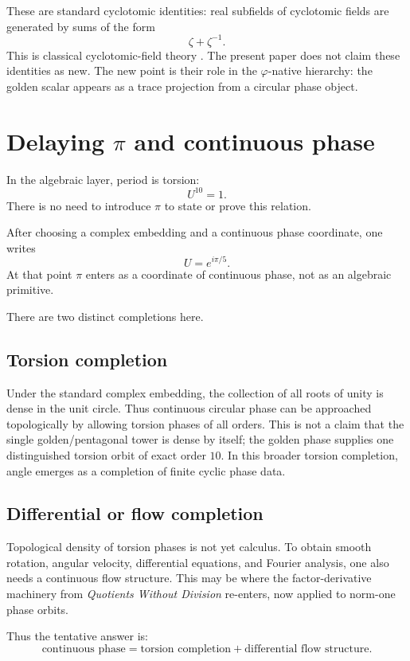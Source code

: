 \documentclass[11pt]{article}
\newcommand{\ph}{\varphi}
\begin{document}
These are standard cyclotomic identities: real subfields of cyclotomic fields are generated by sums of the form
\[
    \zeta+\zeta^{-1}.
\]
This is classical cyclotomic-field theory \cite{Washington1997}.  The present paper does not claim these identities as new.  The new point is their role in the $\ph$-native hierarchy: the golden scalar appears as a trace projection from a circular phase object.

\section{Delaying \texorpdfstring{$\pi$}{pi} and continuous phase}

In the algebraic layer, period is torsion:
\[
    U^{10}=1.
\]
There is no need to introduce $\pi$ to state or prove this relation.

After choosing a complex embedding and a continuous phase coordinate, one writes
\[
    U=e^{i\pi/5}.
\]
At that point $\pi$ enters as a coordinate of continuous phase, not as an algebraic primitive.

There are two distinct completions here.

\subsection{Torsion completion}

Under the standard complex embedding, the collection of all roots of unity is dense in the unit circle.  Thus continuous circular phase can be approached topologically by allowing torsion phases of all orders.  This is not a claim that the single golden/pentagonal tower is dense by itself; the golden phase supplies one distinguished torsion orbit of exact order $10$.  In this broader torsion completion, angle emerges as a completion of finite cyclic phase data.

\subsection{Differential or flow completion}

Topological density of torsion phases is not yet calculus.  To obtain smooth rotation, angular velocity, differential equations, and Fourier analysis, one also needs a continuous flow structure.  This may be where the factor-derivative machinery from \emph{Quotients Without Division} re-enters, now applied to norm-one phase orbits.

Thus the tentative answer is:
\[
\boxed{\text{continuous phase} = \text{torsion completion} + \text{differential flow structure}.}
\]
\end{document}
